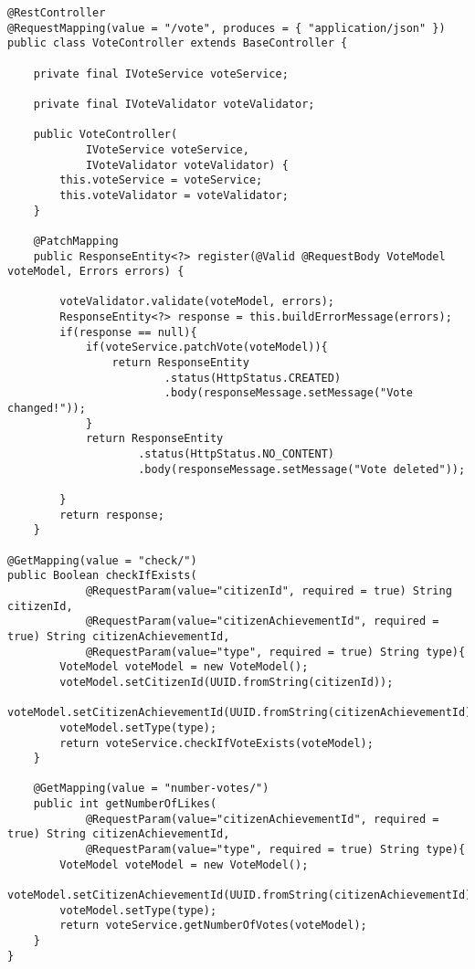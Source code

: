 \begin {lstlisting}
@RestController
@RequestMapping(value = "/vote", produces = { "application/json" })
public class VoteController extends BaseController {

	private final IVoteService voteService;
	
	private final IVoteValidator voteValidator;

	public VoteController(
			IVoteService voteService,
			IVoteValidator voteValidator) {
		this.voteService = voteService;
		this.voteValidator = voteValidator;
	}

	@PatchMapping
	public ResponseEntity<?> register(@Valid @RequestBody VoteModel voteModel, Errors errors) {

		voteValidator.validate(voteModel, errors);
		ResponseEntity<?> response = this.buildErrorMessage(errors);
		if(response == null){
			if(voteService.patchVote(voteModel)){
				return ResponseEntity
						.status(HttpStatus.CREATED)
						.body(responseMessage.setMessage("Vote changed!"));
			}
			return ResponseEntity
					.status(HttpStatus.NO_CONTENT)
					.body(responseMessage.setMessage("Vote deleted"));
			
		}
		return response;
	}
	
@GetMapping(value = "check/")
public Boolean checkIfExists(
    		@RequestParam(value="citizenId", required = true) String citizenId,
    		@RequestParam(value="citizenAchievementId", required = true) String citizenAchievementId,
    		@RequestParam(value="type", required = true) String type){
		VoteModel voteModel = new VoteModel();
		voteModel.setCitizenId(UUID.fromString(citizenId));
		voteModel.setCitizenAchievementId(UUID.fromString(citizenAchievementId));
		voteModel.setType(type);
    	return voteService.checkIfVoteExists(voteModel);
    }
	
	@GetMapping(value = "number-votes/")
    public int getNumberOfLikes(
    		@RequestParam(value="citizenAchievementId", required = true) String citizenAchievementId,
    		@RequestParam(value="type", required = true) String type){
		VoteModel voteModel = new VoteModel();
		voteModel.setCitizenAchievementId(UUID.fromString(citizenAchievementId));
		voteModel.setType(type);
    	return voteService.getNumberOfVotes(voteModel);
    }
}
\end{lstlisting}
